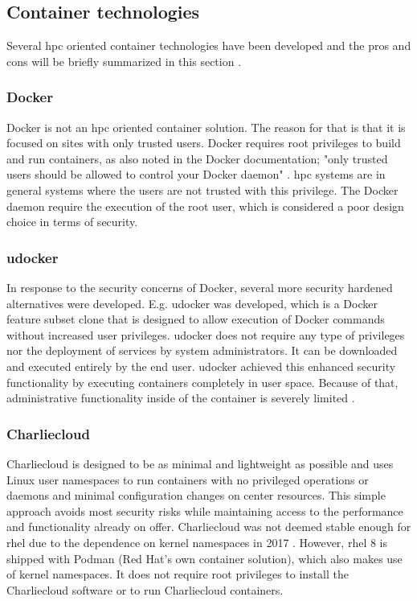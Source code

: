 \documentclass[conference]{IEEEtran}
\begin{document}
\subsection{Container technologies}
Several \gls{hpc} oriented container technologies have been developed and the pros and cons will be briefly summarized in this section \cite{hpc-workloads-justin, saha2018evaluation, stackhpc-state-of-hpc}.


\subsubsection{Docker}
Docker is not an \gls{hpc} oriented container solution. The reason for that is that it is focused on sites with only trusted users. Docker requires root privileges to build and run containers, as also noted in the Docker documentation; "only trusted users should be allowed to control your Docker daemon" \cite{docker-security}. \gls{hpc} systems are in general systems where the users are not trusted with this privilege. The Docker daemon require the execution of the root user, which is considered a poor design choice in terms of security.


\subsubsection{udocker}
In response to the security concerns of Docker, several more security hardened alternatives were developed. E.g. udocker was developed, which is a Docker feature subset clone that is designed to allow execution of Docker commands without increased user privileges. udocker does not require any type of privileges nor the deployment of services by system administrators. It can be downloaded and executed entirely by the end user. udocker achieved this enhanced security functionality by executing containers completely in user space. Because of that, administrative functionality inside of the container is severely limited \cite{utah-udocker}.


\subsubsection{Charliecloud}
Charliecloud is designed to be as minimal and lightweight as possible and uses Linux user namespaces to run containers with no privileged operations or daemons and minimal configuration changes on center resources. This simple approach avoids most security risks while maintaining access to the performance and functionality already on offer. Charliecloud was not deemed stable enough for \gls{rhel} due to the dependence on kernel namespaces in 2017 \cite{kurtzer2017singularity}. However, \gls{rhel} 8 is shipped with Podman (Red Hat's own container solution), which also makes use of kernel namespaces. It does not require root privileges to install the Charliecloud software or to run Charliecloud containers.
\end{document}
